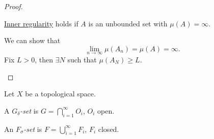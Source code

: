 \begin{proof}
\begin{enumerate}[(a)]
		      \begin{claim}
			      \hyperref[thm:inner-regularity]{Inner regularity} holds if \(A\) is an unbounded set with \(\mu (A) = \infty \).
		      \end{claim}
		      \begin{explanation}
			      We can show that
			      \[
				      \lim_{n \to \infty} \mu (A_{n}) = \mu (A) = \infty.
			      \]
			      Fix \(L>0\), then \(\exists N\) such that \(\mu (A_{N})\geq L\).
		      \end{explanation}
	\end{enumerate}
\end{proof}

\begin{definition*}
	Let \(X\) be a topological space.
	\begin{definition}\label{def:G-delta-set}
		A \emph{\(G_{\delta}\)-set} is \(G = \bigcap_{i=1}^{\infty} O_{i}\), \(O_{i}\) open.
	\end{definition}

	\begin{definition}\label{def:F-sigma-set}
		An \emph{\(F_{\sigma}\)-set} is \(F = \bigcup_{i=1}^{\infty} F_{i}\), \(F_{i}\) closed.
	\end{definition}
\end{definition*}

